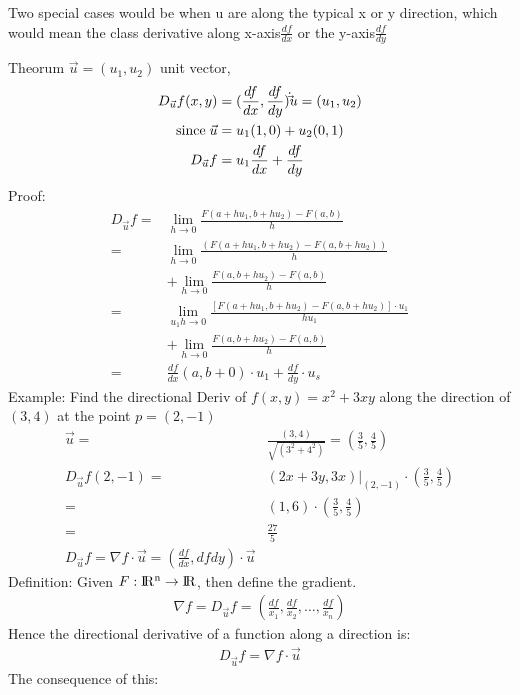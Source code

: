 \documentclass{article}
\newcommand{\R}{\rm I\!R}
\begin{document}
        Two special cases would be when u are along the typical x or y direction, which would mean the class derivative along x-axis$\frac{df}{dx}$ or the y-axis$\frac{df}{dy}$
        
        Theorum $\vec{u} = (u_1,u_2)$ unit vector,
        \begin{align}
            D_{\vec{u}}f(x,y)       &= (\frac{df}{dx},\frac{df}{dy})\dot\vec{u}=(u_1,u_2)\\
            \text{since\;}\vec{u}   &= u_1(1,0)+u_2(0,1)\\
            D_{\vec{u}}f            &= u_1\frac{df}{dx}+\frac{df}{dy}
        \end{align}
        Proof:
        \begin{align}
            D_{\vec{u}}f =& \lim_{h\rightarrow0}{\frac{F(a+hu_1,b+hu_2)-F(a,b)}{h}}\\
            =& \lim_{h\rightarrow0}\frac{(F(a+hu_1,b+hu_2)-F(a,b+hu_2))}{h}\\
            &+ \lim_{h\rightarrow0}\frac{F(a,b+hu_2)-F(a,b)}{h}\\
            =& \lim_{u_1h\rightarrow0}{\frac{\left[F(a+hu_1,b+hu_2)-F(a,b+hu_2)\right]\cdot u_1}{hu_1}}\\ 
            &+ \lim_{h\rightarrow0}{\frac{F(a,b+hu_2)-F(a,b)}{h}}\\
            =& \frac{df}{dx}(a,b + 0)\cdot u_1 + \frac{df}{dy}\cdot u_s
        \end{align}
        Example: Find the directional Deriv of $f(x,y) = x^2+3xy$ along the direction of $(3,4)$ at the point $p = (2,-1)$
        \begin{align}
            \vec{u} =& \frac{(3,4)}{\sqrt{(3^2+4^2)}} = (\frac{3}{5},\frac{4}{5})\\
            D_{\vec{u}}f(2,-1) =& (2x+3y,3x)|_{(2,-1)} \cdot (\frac{3}{5},\frac{4}{5})\\
            =& (1,6)\cdot(\frac{3}{5},\frac{4}{5})\\
            =&\frac{27}{5}\\
            D_{\vec{u}}f = \nabla f\cdot\vec{u} = (\frac{df}{dx},{df}{dy})\cdot\vec{u}
        \end{align}
        Definition: Given $F:\R^n\rightarrow\R$, then define the gradient. 
        \begin{align}
            \nabla f = D_{\vec{u}}f = (\frac{df}{x_1},\frac{df}{x_2},\dots,\frac{df}{x_n})
        \end{align}
        Hence the directional derivative of a function along a direction is:
        \begin{align}
            D_{\vec{u}}f = \nabla f\cdot\vec{u}
        \end{align}
        The consequence of this:
        
\end{document}

